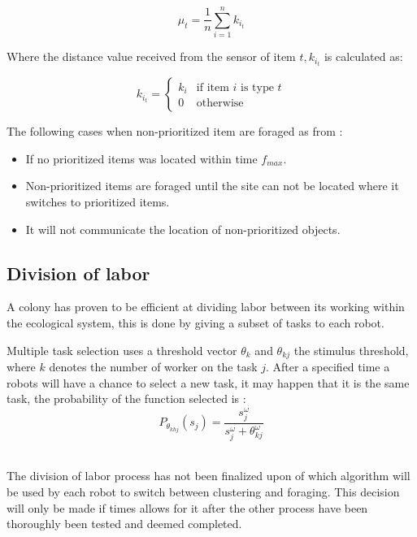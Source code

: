 \documentclass[12pt]{article}
\begin{document}
{\[ \mu_{t} = \frac{1}{n} \sum_{i=1}^{n}k_{i_{t}} \]

\par{Where the distance value received from the sensor of item \( t, k_{i_{t}} \) is calculated as:}

\[ k_{i_{t}} = \begin{cases} k_{i} & \text{if item \(i\) is type \(t\)}\\ 0 & \mathrm{otherwise}\end{cases} \]

\par{The following cases when non-prioritized item are foraged as from \cite{Jade-2014}:}

\begin{itemize}
	\item If no prioritized items was located within time \( f_{max} \).
	\item Non-prioritized items are foraged until the site can not be located where it switches to prioritized items.
	\item It will not communicate the location of non-prioritized objects.
\end{itemize}

\subsection{Division of labor}
\par{A colony has proven to be efficient at dividing labor between its working within the ecological system, this is done by giving a subset of tasks to each robot.
}
\\
\par{Multiple task selection \cite{Engel} uses a threshold vector \( \theta_{k} \) and  \( \theta_{kj} \) the stimulus threshold, where \( k \) denotes the number of worker on the task \( j \). After a specified time a robots will have a chance to select a new task, it may happen that it is the same task, the probability of the function selected is \cite{Engel}:}
\[ P_{\theta_{khj}}\left( s_{j} \right) = \frac{s_{j}^\omega}{s_{j}^\omega + \theta_{kj}^\omega} \]
\\
\par{The division of labor process has not been finalized upon of which algorithm will be used by each robot to switch between clustering and foraging. This decision will only be made if times allows for it after the other process have been thoroughly been tested and deemed completed.}


}
\end{document}
